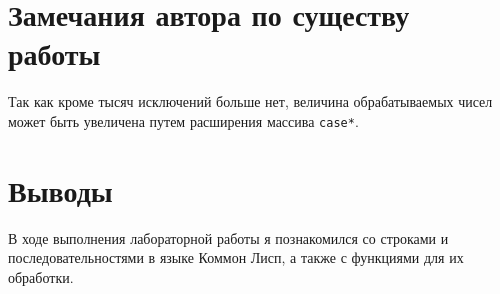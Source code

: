 \documentclass[12pt]{article}
\begin{document}
\section{Замечания автора по существу работы}
Так как кроме тысяч исключений больше нет, величина обрабатываемых чисел может быть увеличена путем расширения массива {\tt *case*}.

\section{Выводы}
В ходе выполнения лабораторной работы я познакомился со строками и последовательностями в языке Коммон Лисп, а также с функциями для их обработки. 
\end{document}
